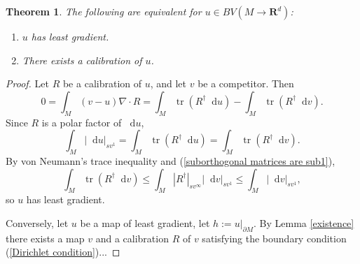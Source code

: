 \documentclass[reqno,11pt]{amsart}
\newcommand{\RR}{\mathbf{R}}
\newcommand*\dif{\mathop{}\!\mathrm{d}}
\DeclareMathOperator{\tr}{tr}
\newtheorem{theorem}{Theorem}[section]
\theoremstyle{definition}
\numberwithin{equation}{section}
\begin{document}
\begin{theorem}
The following are equivalent for $u \in BV(M \to \RR^d)$:
\begin{enumerate}
\item $u$ has least gradient.
\item There exists a calibration of $u$.
\end{enumerate}
\end{theorem}
\begin{proof}
Let $R$ be a calibration of $u$, and let $v$ be a competitor. Then
$$0 = \int_M (v - u) \nabla \cdot R = \int_M \tr(R^\dagger \dif u) - \int_M \tr(R^\dagger \dif v).$$
Since $R$ is a polar factor of $\dif u$,
$$\int_M |\dif u|_{sv^1} = \int_M \tr(R^\dagger \dif u) = \int_M \tr(R^\dagger \dif v).$$
By von Neumann's trace inequality and (\ref{suborthogonal matrices are sub1}),
$$\int_M \tr(R^\dagger \dif v) \leq \int_M |R^\dagger|_{sv^\infty} |\dif v|_{sv^1} \leq \int_M |\dif v|_{sv^1},$$
so $u$ has least gradient.

Conversely, let $u$ be a map of least gradient, let $h := u|_{\partial M}$.
By Lemma \ref{existence} there exists a map $v$ and a calibration $R$ of $v$ satisfying the boundary condition (\ref{Dirichlet condition})...
\end{proof}


\printbibliography
\end{document}
